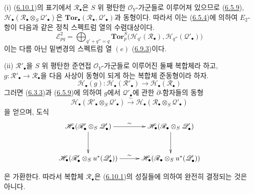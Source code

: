 \begin{remarks}[6.10.3]
\label{III.6.10.3-fr}
\textnormal{(i)} (\hyperref[III.6.10.1-fr]{6.10.1})의 표기에서
$\mathscr R_\bullet$은 $S$ 위 평탄한 $\mathscr O_Y$-가군들로
이루어져 있으므로 (\hyperref[III.6.5.9-fr]{6.5.9}),
$\mathscr H_\bullet(\mathscr R_\bullet\otimes_S\mathscr Q'_\bullet)$은
$\mathbf{Tor}_\bullet(\mathscr R_\bullet,\mathscr Q'_\bullet)$과
동형이다. 따라서 이는 (\hyperref[III.6.5.4-fr]{6.5.4})에 의하여
$E_2$-항이 다음과 같은 정칙 스펙트럼 열의 수렴대상이다.
\[
  \mathscr E_{pq}^2
  =
  \bigoplus_{q'+q''=q}
  \mathbf{Tor}_p^S
  \bigl(
    \mathscr H_{q'}(\mathscr R_\bullet),
    \mathscr H_{q''}(\mathscr Q'_\bullet)
  \bigr)
  \tag{6.10.3.1}\label{III.6.10.3.1.fr}
\]
이는 다름 아닌 밑변경의 스펙트럼 열
$(e)$ (\hyperref[III.6.9.3-fr]{6.9.3})이다.

\medskip
\textnormal{(ii)} $\mathscr R'_\bullet$을 $S$ 위 평탄한 준연접
$\mathscr O_Y$-가군들로 이루어진 둘째 복합체라 하고,
$g:\mathscr R'_\bullet\to\mathscr R_\bullet$을 다음 사상이 동형이
되게 하는 복합체 준동형이라 하자.
\[
  \mathscr H_\bullet(g):
  \mathscr H_\bullet(\mathscr R'_\bullet)
  \longrightarrow
  \mathscr H_\bullet(\mathscr R_\bullet)
\]
그러면 (\hyperref[III.6.3.3-fr]{6.3.3})과
(\hyperref[III.6.5.9-fr]{6.5.9})에 의하여 $g$에서
$\mathscr Q'_\bullet$에 관한 $\partial$-함자들의 동형
\[
  \mathscr H_\bullet
  (\mathscr R'_\bullet\otimes_S\mathscr Q'_\bullet)
  \xrightarrow{\sim}
  \mathscr H_\bullet
  (\mathscr R_\bullet\otimes_S\mathscr Q'_\bullet)
\]
을 얻으며, 도식
\[
\xymatrix@C=28pt@R=30pt{
  \mathscr H_\bullet
  (\mathscr R'_\bullet\otimes_S\mathscr Q'_\bullet)
  \ar[r]^-{\sim}\ar[d]
  &
  \mathscr H_\bullet
  (\mathscr R_\bullet\otimes_S\mathscr Q'_\bullet)
  \ar[d]
  \\
  \mathscr H_\bullet
  (\mathscr R'_\bullet\otimes_Su^*(\mathscr Q'_\bullet))
  \ar[r]^-{\sim}
  &
  \mathscr H_\bullet
  (\mathscr R_\bullet\otimes_Su^*(\mathscr Q'_\bullet))
}
\]
\par\medskip\noindent
은 가환한다. 따라서 복합체 $\mathscr R_\bullet$은
(\hyperref[III.6.10.1-fr]{6.10.1})의 성질들에 의하여 완전히
결정되는 것은 아니다.


\end{remarks}
